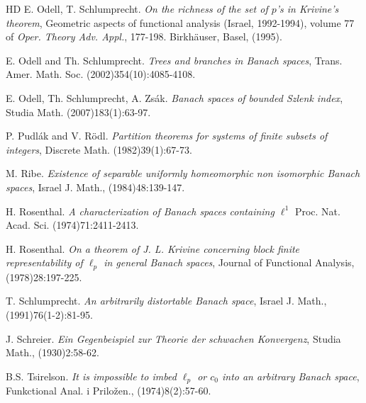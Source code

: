 \documentclass[12pt]{amsart}
\theoremstyle{definition}
\begin{document}
\begin{thebibliography}{HD}
  E. Odell, T. Schlumprecht. \emph{On the richness of the set of $p$'s in Krivine's theorem}, Geometric aspects of functional analysis (Israel, 1992-1994), volume 77 of \emph{Oper. Theory Adv. Appl.}, 177-198. Birkh\"{a}user, Basel, (1995).

 E. Odell and Th. Schlumprecht. \emph{Trees and branches in Banach spaces}, Trans. Amer. Math. Soc. (2002)354(10):4085-4108. 

 E. Odell, Th. Schlumprecht, A. Zs\'{a}k.  \emph{Banach spaces of bounded Szlenk index}, Studia Math. (2007)183(1):63-97. 

 P. Pudl\'{a}k and V. R\"{o}dl. \emph{Partition theorems for systems of finite subsets of integers}, Discrete Math. (1982)39(1):67-73.

 M. Ribe. \emph{Existence of separable uniformly homeomorphic non isomorphic Banach spaces}, Israel J. Math., (1984)48:139-147.  

 H. Rosenthal.  \emph{A characterization of Banach spaces containing $\ell^1$} Proc. Nat. Acad. Sci. (1974)71:2411-2413. 

 H. Rosenthal. \emph{On a theorem of J. L. Krivine concerning block finite representability of $\ell_p$ in general Banach spaces}, Journal of Functional Analysis, (1978)28:197-225. 


 T. Schlumprecht. \emph{An arbitrarily distortable Banach space}, Israel J. Math., (1991)76(1-2):81-95.  

 J. Schreier. \emph{Ein Gegenbeispiel zur Theorie der schwachen Konvergenz}, Studia Math., (1930)2:58-62.  

 B.S. Tsirelson. \emph{It is impossible to imbed $\ell_p$ or $c_0$ into an arbitrary Banach space}, Funkctional Anal. i Prilo\v{z}en., (1974)8(2):57-60.  

\end{thebibliography}
\end{document}
